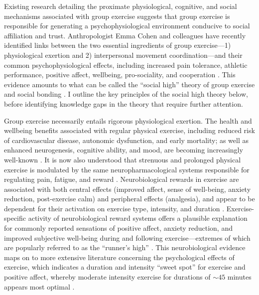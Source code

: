 \begin{CJK}{UTF8}{gbsn}
Existing research detailing the proximate physiological, cognitive, and social mechanisms associated with group exercise suggests that group exercise is responsible for generating a psychophysiological environment conducive to social affiliation and trust.  Anthropologist Emma Cohen and colleagues have recently identified links between the two essential ingredients of group exercise---1) physiological exertion and 2) interpersonal movement coordination---and their common psychophysiological effects, including increased pain tolerance, athletic performance, positive affect, wellbeing, pro-sociality, and cooperation \citep{Davis2015}. This evidence amounts to what can be called the ``social high'' theory of group exercise and social bonding \citep[hereafter ``the social high theory,'' see][]{Cohen2017}.  I outline the key principles of the social high theory below, before identifying knowledge gaps in the theory that require further attention.

Group exercise necessarily entails rigorous physiological exertion.
The health and wellbeing benefits associated with regular physical exercise, including reduced risk of cardiovascular disease, autonomic dysfunction, and early mortality; as well as enhanced neurogenesis, cognitive ability, and mood, are becoming increasingly well-known \citep{Blair1994,Nagamatsu2014}. It is now also understood that strenuous and prolonged physical exercise is modulated by the same neuropharmacological systems responsible for regulating pain, fatigue, and reward \citep{Boecker2008,Raichlen2013}.  Neurobiological rewards in exercise are associated with both central effects (improved affect, sense of well-being, anxiety reduction, post-exercise calm) and peripheral effects (analgesia), and appear to be dependent for their activation on exercise type, intensity, and duration \citep{Dietrich2004}.  Exercise-specific activity of neurobiological reward systems offers a plausible explanation for commonly reported sensations of positive affect, anxiety reduction, and improved subjective well-being during and following exercise---extremes of which are popularly referred to as the ``runner's high'' \citep{Dietrich2004,Boecker2008,Raichlen2012}.  This neurobiological evidence maps on to more extensive literature concerning the psychological effects of exercise, which indicates a duration and intensity ``sweet spot'' for exercise and positive affect, whereby moderate intensity exercise for durations of $\sim45$ minutes appears most optimal \citep{Reed2006}.


\end{CJK}
